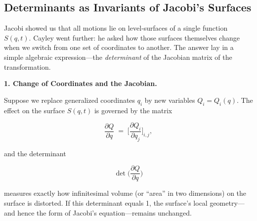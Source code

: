 \subsection{Determinants as Invariants of Jacobi’s Surfaces}

Jacobi showed us that all motions lie on level‐surfaces of a single function \(S(q,t)\).  Cayley went further: he asked how those surfaces themselves change when we switch from one set of coordinates to another.  The answer lay in a simple algebraic expression—the \emph{determinant} of the Jacobian matrix of the transformation.

\textbf{1. Change of Coordinates and the Jacobian.}  

Suppose we replace generalized coordinates \(q_i\) by new variables \(Q_i = Q_i(q)\).  The effect on the surface \(S(q,t)\) is governed by the matrix

\[
\frac{\partial Q}{\partial q}
\;=\;
\biggl[\frac{\partial Q_i}{\partial q_j}\biggr]_{i,j},
\]

and the determinant

\[
\det\!\biggl(\frac{\partial Q}{\partial q}\biggr)
\]

measures exactly how infinitesimal volume (or “area” in two dimensions) on the surface is distorted.  If this determinant equals 1, the surface’s local geometry—and hence the form of Jacobi’s equation—remains unchanged.


